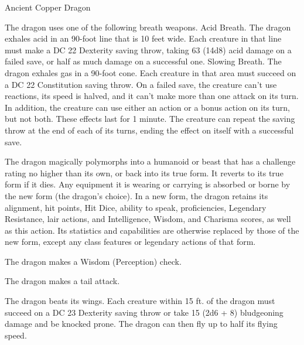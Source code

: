 \begin{monsterbox}{Ancient Copper Dragon}
\begin{monsteraction}
The dragon uses one of the following breath weapons.
Acid Breath. The dragon exhales acid in an 90-foot line that is 10 feet wide. Each creature in that line must make a DC 22 Dexterity saving throw, taking 63 (14d8) acid damage on a failed save, or half as much damage on a successful one.
Slowing Breath. The dragon exhales gas in a 90-foot cone. Each creature in that area must succeed on a DC 22 Constitution saving throw. On a failed save, the creature can't use reactions, its speed is halved, and it can't make more than one attack on its turn. In addition, the creature can use either an action or a bonus action on its turn, but not both. These effects last for 1 minute. The creature can repeat the saving throw at the end of each of its turns, ending the effect on itself with a successful save.
\end{monsteraction}
\begin{monsteraction}
The dragon magically polymorphs into a humanoid or beast that has a challenge rating no higher than its own, or back into its true form. It reverts to its true form if it dies. Any equipment it is wearing or carrying is absorbed or borne by the new form (the dragon's choice).
In a new form, the dragon retains its alignment, hit points, Hit Dice, ability to speak, proficiencies, Legendary Resistance, lair actions, and Intelligence, Wisdom, and Charisma scores, as well as this action. Its statistics and capabilities are otherwise replaced by those of the new form, except any class features or legendary actions of that form.
\end{monsteraction}
\begin{monsteraction}[Detect]
The dragon makes a Wisdom (Perception) check.
\end{monsteraction}
\begin{monsteraction}
The dragon makes a tail attack.
\end{monsteraction}
\begin{monsteraction}
The dragon beats its wings. Each creature within 15 ft. of the dragon must succeed on a DC 23 Dexterity saving throw or take 15 (2d6 + 8) bludgeoning damage and be knocked prone. The dragon can then fly up to half its flying speed.
\end{monsteraction}
\end{monsterbox}